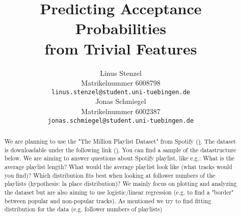 \documentclass{article}
\title{Predicting Acceptance Probabilities\\ from Trivial Features}
\author{%
  Linus Stenzel\\
  Matrikelnummer 6008798\\
  \texttt{linus.stenzel@student.uni-tuebingen.de} \\
  \And
  Jonas Schmiegel\\
  Matrikelnummer 6002387\\
  \texttt{jonas.schmiegel@student.uni-tuebingen.de} \\
}
\begin{document}
\maketitle

\begin{abstract}
  We are planning to use the "The Million Playlist Dataset" from Spotify (\href{https://research.atspotify.com/datasets/}). The dataset is downloadable under the following link (\href{https://www.aicrowd.com/challenges/spotify-million-playlist-dataset-challenge}). You can find a sample of the datastructure below.
  We are aiming to answer questions about Spotify playlist, like e.g.: What is the average playlist length? What would the average playlist look like (what tracks would you find)? Which distribution fits best when looking at follower numbers of the playlists (hypothesis: la place distribution)? 
  We mainly focus on plotting and analyzing the dataset but are also aiming to use logistic/linear regression (e.g. to find a "border" between popular and non-popular tracks). As mentioned we try to find fitting distribution for the data (e.g. follower numbers of playlists)
\end{abstract}
\end{document}
